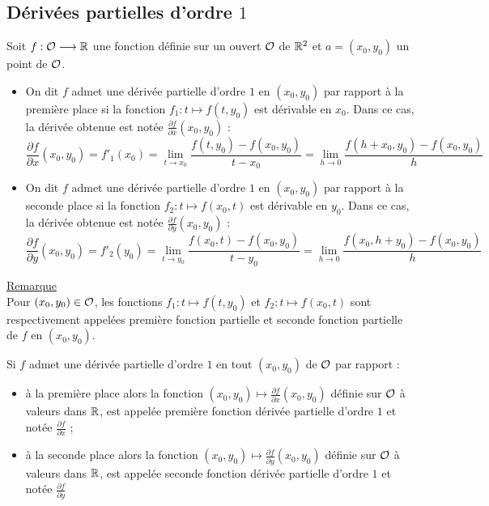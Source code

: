 \subsection{Dérivées partielles d’ordre \(1\)}
    Soit \(f : \cal{O} \to  \R\) une fonction définie sur un ouvert \(\cal{O}\) de \(\R^2\) et \(a = (x_0, y_0)\) un point de \(\cal{O}\).
\begin{defprop}
    \begin{itemize}
        \item On dit \(f\) admet une dérivée partielle d’ordre \(1\) en \((x_0, y_0)\) par rapport à la première place si la fonction \(f_1 : t \mapsto f (t, y_0)\) est dérivable en \(x_0\).
        Dans ce cas, la dérivée obtenue est notée \(\frac{\partial f}{\partial x} (x_0, y_0)\) :
        \[\frac{\partial f}{\partial x} (x_0, y_0) = f'_{1}(x_0) =  \lim_{t\to x_0} \frac{f (t, y_0) - f (x_0, y_0)}{t - x_0} = \lim_{h\to 0} \frac{f (h + x_0, y_0) - f (x_0, y_0)}{h} \]
        \item On dit \(f\) admet une dérivée partielle d’ordre \(1\) en \((x_0, y_0)\) par rapport à la seconde place si la fonction \(f_2 : t \mapsto f (x_0, t)\) est dérivable en \(y_0\).
        Dans ce cas, la dérivée obtenue est notée \(\frac{\partial f}{\partial y} (x_0, y_0)\) :
        \[\frac{\partial f}{\partial y} (x_0, y_0) = f'_2(y_0) = \lim_{t\to y_0} \frac{f (x_0, t) - f (x_0, y_0)}{t - y_0}= \lim_{h\to 0} \frac{f (x_0, h + y_0) - f (x_0, y_0)}{h}\]
    \end{itemize}
    \underline{Remarque}\\
    Pour \((x_0, y_0) \in \cal{O}\), les fonctions \(f_1 : t \mapsto f (t, y_0)\) et \(f_2 : t \mapsto f (x_0, t)\) sont respectivement appelées première fonction partielle et seconde fonction partielle de \(f\) en \((x_0, y_0)\).
\end{defprop}
\begin{defprop}
    Si \(f\) admet une dérivée partielle d’ordre \(1\) en tout \((x_0, y_0)\) de \(\cal{O}\) par rapport :
    \begin{itemize}
    \item à la première place alors la fonction \((x_0, y_0) \mapsto \frac{\partial f}{\partial x} (x_0, y_0)\) définie sur \(\cal{O}\) à valeurs dans \(\R\), est appelée première fonction dérivée partielle d’ordre \(1\) et notée \(\frac{\partial f}{\partial x}\) ;
    \item à la seconde place alors la fonction \((x_0, y_0) \mapsto \frac{\partial f}{\partial y} (x_0, y_0)\) définie sur \(\cal{O}\) à valeurs dans \(\R\), est appelée seconde fonction dérivée partielle d’ordre \(1\) et notée \(\frac{\partial f}{\partial y}\)
    \end{itemize} 
\end{defprop}

